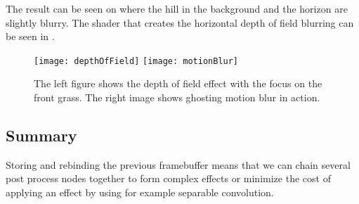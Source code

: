
The result can be seen on  where the hill in
the background and the horizon are slightly blurry. The shader that
creates the horizontal depth of field blurring can be seen in
.


\begin{figure}
  \label{fig:dofMotionBlur}
  \centering
  \texttt{[image: depthOfField]}
  \texttt{[image: motionBlur]}
  \caption{The left figure shows the depth of field effect with the
    focus on the front grass. The right image shows ghosting motion
    blur in action.}
\end{figure}




\subsection{Summary}

Storing and rebinding the previous framebuffer means that we can chain
several post process nodes together to form complex effects or
minimize the cost of applying an effect by using for example separable
convolution.






